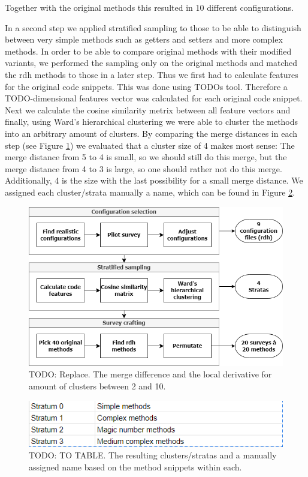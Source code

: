 \documentclass[%
class=scrreprt,
chapterprefix=false,%
open=right,%
twoside=false,%
paper=a4,%
logofile={Logo\_zentral\_farbig\_EN.png},%
thesistype=master,%
UKenglish,%
]{se2thesis}
\begin{document}
	Together with the original methods this resulted in 10 different configurations.
	
	In a second step we applied stratified sampling to those to be able to distinguish between very simple methods such as getters and setters and more complex methods. In order to be able to compare original methods with their modified variants, we performed the sampling only on the original methods and matched the rdh methods to those in a later step.
	Thus we first had to calculate features for the original code snippets. This was done using TODOs tool. Therefore a TODO-dimensional features vector was calculated for each original code snippet. Next we calculate the cosine similarity metrix between all feature vectors and finally, using Ward's hierarchical clustering we were able to cluster the methods into an arbitrary amount of clusters.
	By comparing the merge distances in each step (see Figure \ref{fig:survey_cluster_amount}) we evaluated that a cluster size of 4 makes most sense: The merge distance from 5 to 4 is small, so we should still do this merge, but the merge distance from 4 to 3 is large, so one should rather not do this merge. Additionally, 4 is the size with the last possibility for a small merge distance. We assigned each cluster/strata manually a name, which can be found in Figure \ref{fig:survey_strata_labeles}.
	
	\begin{figure}[t]
		\centering
		\includegraphics[width=\textwidth]{img/survey_pipeline.png}
		\caption{TODO: Replace. The merge difference and the local derivative for amount of clusters between 2 and 10.} 
		\label{fig:survey_cluster_amount}
	\end{figure}
	
	\begin{figure}[t]
		\centering
		\includegraphics[width=\textwidth]{img/stratas_manual_labelled.png}
		\caption{TODO: TO TABLE. The resulting clusters/stratas and a manually assigned name based on the method snippets within each.} 
		\label{fig:survey_strata_labeles}
	\end{figure}
	
\end{document}
